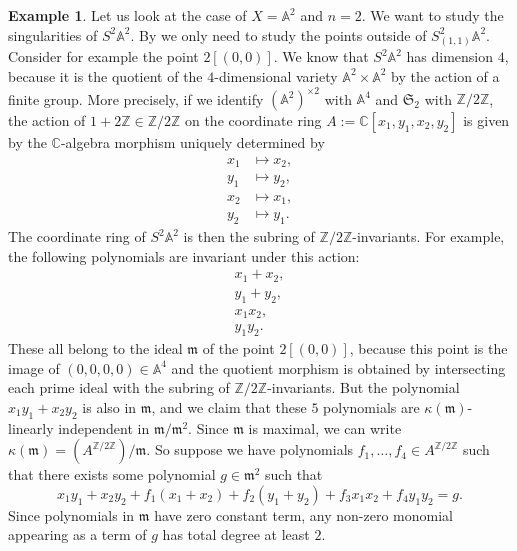 \documentclass[12pt,a4paper]{amsart}
\theoremstyle{plain}
\theoremstyle{definition}
\newtheorem{exmp}[thm]{Example}
\theoremstyle{remark}
\begin{document}
\begin{exmp}
  Let us look at the case of $X = \mathbb{A}^{2}$ and $n = 2$.
  We want to study the singularities of $S^{2}\mathbb{A}^{2}$.
  By  we only need to study the points outside of $S^{2}_{(1,1)}\mathbb{A}^{2}$.
  Consider for example the point $2[(0,0)]$.
  We know that $S^{2}\mathbb{A}^{2}$ has dimension $4$, because it is the quotient of the $4$-dimensional variety $\mathbb{A}^{2} \times \mathbb{A}^{2}$ by the action of a finite group.
  More precisely, if we identify $(\mathbb{A}^{2})^{\times 2}$ with $\mathbb{A}^{4}$ and $\mathfrak{S}_{2}$ with $\mathbb{Z}/2\mathbb{Z}$, the action of $1 + 2\mathbb{Z} \in \mathbb{Z}/2\mathbb{Z}$ on the coordinate ring $A := \mathbb{C}[x_{1}, y_{1}, x_{2}, y_{2}]$ is given by the $\mathbb{C}$-algebra morphism uniquely determined by
  \begin{align*}
    x_{1} & \mapsto x_{2}, \\
    y_{1} & \mapsto y_{2}, \\
    x_{2} & \mapsto x_{1}, \\
    y_{2} & \mapsto y_{1}.
  \end{align*}
  The coordinate ring of $S^{2}\mathbb{A}^{2}$ is then the subring of $\mathbb{Z}/2\mathbb{Z}$-invariants.
  For example, the following polynomials are invariant under this action:
  \begin{align*}
    x_{1} + x_{2}, \\
    y_{1} + y_{2}, \\
    x_{1}x_{2}, \\
    y_{1}y_{2}.
  \end{align*}
  These all belong to the ideal $\mathfrak{m}$ of the point $2[(0,0)]$, because this point is the image of $(0,0,0,0) \in \mathbb{A}^{4}$ and the quotient morphism is obtained by intersecting each prime ideal with the subring of $\mathbb{Z}/2\mathbb{Z}$-invariants.
  But the polynomial $x_{1}y_{1} + x_{2}y_{2}$ is also in $\mathfrak{m}$, and we claim that these $5$ polynomials are $\kappa(\mathfrak{m})$-linearly independent in $\mathfrak{m}/\mathfrak{m}^{2}$.
  Since $\mathfrak{m}$ is maximal, we can write $\kappa(\mathfrak{m}) = (A^{\mathbb{Z}/2\mathbb{Z}})/\mathfrak{m}$.
  So suppose we have polynomials $f_{1}, \ldots, f_{4} \in A^{\mathbb{Z}/2\mathbb{Z}}$ such that there exists some polynomial $g \in \mathfrak{m}^{2}$ such that
  \[ x_{1}y_{1} + x_{2}y_{2} + f_{1}(x_{1} + x_{2}) + f_{2}(y_{1} + y_{2}) + f_{3}x_{1}x_{2} + f_{4}y_{1}y_{2} = g. \]
  Since polynomials in $\mathfrak{m}$ have zero constant term, any non-zero monomial appearing as a term of $g$ has total degree at least $2$.

\end{exmp}
\end{document}
